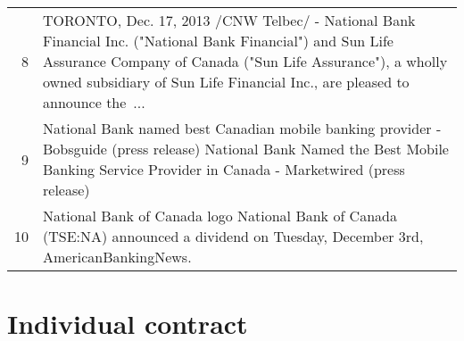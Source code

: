 \documentclass{tufte-handout}\usepackage[]{graphicx}\usepackage[]{color}
\makeatletter
\newenvironment{kframe}{%
 \def\at@end@of@kframe{}%
 \ifinner\ifhmode%
  \def\at@end@of@kframe{\end{minipage}}%
  \begin{minipage}{\columnwidth}%
 \fi\fi%
 \def\FrameCommand##1{\hskip\@totalleftmargin \hskip-\fboxsep
 \colorbox{shadecolor}{##1}\hskip-\fboxsep
     \hskip-\linewidth \hskip-\@totalleftmargin \hskip\columnwidth}%
 \MakeFramed {\advance\hsize-\width
   \@totalleftmargin\z@ \linewidth\hsize
   \@setminipage}}%
 {\par\unskip\endMakeFramed%
 \at@end@of@kframe}
\newenvironment{knitrout}{}{} %
\makeatother
\begin{document}
\begin{tabularx}{\textwidth}{rX}
  8 &  TORONTO, Dec. 17, 2013 /CNW Telbec/ - National Bank Financial Inc. ("National Bank Financial") and Sun Life Assurance Company of Canada ("Sun Life Assurance"), a wholly owned subsidiary of Sun Life Financial Inc., are pleased to announce the ...  \\ 
  9 &  National Bank named best Canadian mobile banking provider  -  Bobsguide (press release) National Bank Named the Best Mobile Banking Service Provider in Canada  -  Marketwired (press release) \\ 
  10 &  National Bank of Canada logo National Bank of Canada (TSE:NA) announced a dividend on Tuesday, December 3rd, AmericanBankingNews.  \\ 
   \hline
\end{tabularx}



\newpage
\section{Individual contract}
\begin{fullwidth}
\begin{knitrout}
\color{fgcolor}\begin{kframe}


{\ttfamily\noindent\bfseries\color{errorcolor}{\#\# Error: subscript out of bounds}}\end{kframe}
\end{knitrout}


\end{fullwidth}
\end{document}
